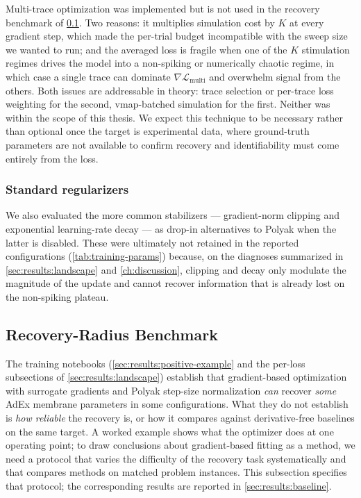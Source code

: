 Multi-trace optimization was implemented but is not used in the recovery benchmark of \cref{sec:method:opt:recovery-benchmark}.
Two reasons: it multiplies simulation cost by $K$ at every gradient step, which made the per-trial budget incompatible with the sweep size we wanted to run;
and the averaged loss is fragile when one of the $K$ stimulation regimes drives the model into a non-spiking or numerically chaotic regime,
in which case a single trace can dominate $\nabla\mathcal{L}_{\mathrm{multi}}$ and overwhelm signal from the others.
Both issues are addressable in theory: trace selection or per-trace loss weighting for the second, vmap-batched simulation for the first.
Neither was within the scope of this thesis.
We expect this technique to be necessary rather than optional once the target is experimental data,
where ground-truth parameters are not available to confirm recovery and identifiability must come entirely from the loss.

\subsubsection{Standard regularizers}\label{sec:method:opt:stabilization:misc}
We also evaluated the more common stabilizers --- gradient-norm clipping and exponential learning-rate decay ---
as drop-in alternatives to Polyak when the latter is disabled.
These were ultimately not retained in the reported configurations (\cref{tab:training-params})
because, on the diagnoses summarized in \cref{sec:results:landscape} and \cref{ch:discussion},
clipping and decay only modulate the magnitude of the update and cannot recover information that is already lost on the non-spiking plateau.

\subsection{Recovery-Radius Benchmark}\label{sec:method:opt:recovery-benchmark}
The training notebooks (\cref{sec:results:positive-example} and the per-loss subsections of \cref{sec:results:landscape}) establish that
gradient-based optimization with surrogate gradients and Polyak step-size normalization \emph{can} recover \emph{some} \gls{AdEx} membrane parameters in some configurations.
What they do not establish is \emph{how reliable} the recovery is, or how it compares against derivative-free baselines on the same target.
A worked example shows what the optimizer does at one operating point;
to draw conclusions about gradient-based fitting as a method, we need a protocol that varies the difficulty of the recovery task systematically
and that compares methods on matched problem instances.
This subsection specifies that protocol; the corresponding results are reported in \cref{sec:results:baseline}.


